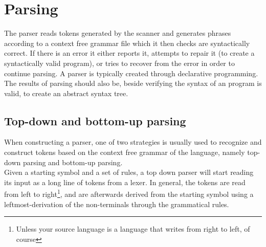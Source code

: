 \section{Parsing}
The parser reads tokens generated by the scanner and generates phrases according to a context free grammar file which it then checks are syntactically correct. If there is an error it either reports it, attempts to repair it (to create a syntactically valid program), or tries to recover from the error in order to continue parsing. A parser is typically created through declarative programming. The results of parsing should also be, beside verifying the syntax of an program is valid, to create an abstract syntax tree.


\subsection{Top-down and bottom-up parsing}
When constructing a parser, one of two strategies is usually used to recognize and construct tokens based on the context free grammar of the language, namely top-down parsing and bottom-up parsing.\\

Given a starting symbol and a set of rules, a top down parser will start reading its input as a long line of tokens from a lexer. In general, the tokens are read from left to right\footnote{Unless your source language is a language that writes from right to left, of course}, and are afterwards derived from the starting symbol using a leftmost-derivation of the non-terminals through the grammatical rules.

